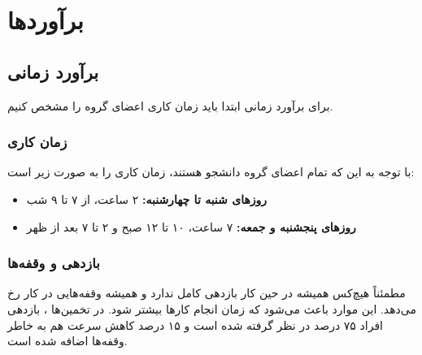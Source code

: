 	\chapter{برآوردها}
\section{برآورد زمانی}
برای برآورد زمانی ابتدا باید زمان کاری اعضای گروه را مشخص کنیم.

\subsection{زمان کاری}
با توجه به این که تمام اعضای گروه دانشجو هستند، زمان کاری را به صورت زیر است:

\begin{itemize}
	\item
	\textbf{روزهای شنبه تا چهارشنبه:}
	۲ ساعت، از ۷ تا ۹ شب
	\item 
	\textbf{روزهای پنجشنبه و جمعه:}
	۷ ساعت، ۱۰ تا ۱۲ صبح و ۲ تا ۷ بعد از ظهر
\end{itemize}

\subsection{بازدهی و وقفه‌ها}
مطمئناً هیچ‌کس همیشه در حین کار بازدهی کامل ندارد و همیشه وقفه‌هایی در کار رخ می‌دهد. این موارد باعث می‌شود که زمان انجام کارها بیشتر شود.  در تخمین‌ها ، بازدهی افراد ۷۵ درصد در نظر گرفته شده است و ۱۵ درصد کاهش سرعت هم به خاطر وقفه‌ها اضافه شده است.
